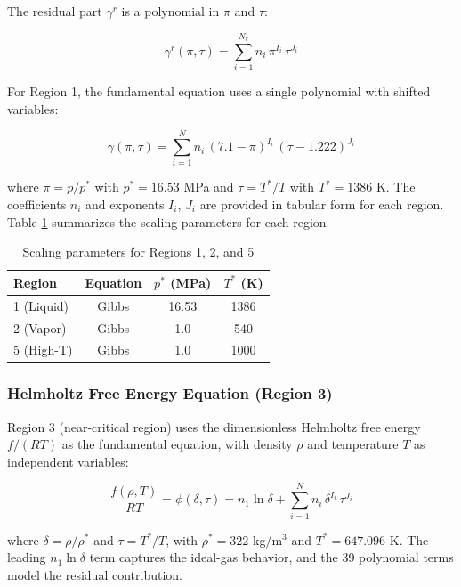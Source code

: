 \documentclass{article}
\begin{document}
The residual part $\gamma^r$ is a polynomial in $\pi$ and $\tau$:

\begin{equation}
\gamma^r(\pi,\tau) = \sum_{i=1}^{N_r} n_i \, \pi^{I_i} \, \tau^{J_i}
\label{eq:gibbs_residual}
\end{equation}

For Region 1, the fundamental equation uses a single polynomial with shifted variables:

\begin{equation}
\gamma(\pi,\tau) = \sum_{i=1}^{N} n_i \, (7.1 - \pi)^{I_i} \, (\tau - 1.222)^{J_i}
\label{eq:gibbs_r1}
\end{equation}

where $\pi = p/p^{*}$ with $p^{*} = 16.53$ MPa and $\tau = T^{*}/T$ with $T^{*} = 1386$ K. The coefficients $n_i$ and exponents $I_i$, $J_i$ are provided in tabular form for each region. Table \ref{tab:region_params} summarizes the scaling parameters for each region.

\begin{table}[H]
\centering
\caption{Scaling parameters for Regions 1, 2, and 5}
\label{tab:region_params}
\begin{tabular}{lccc}
\toprule
\textbf{Region} & \textbf{Equation} & \textbf{$p^{*}$ (MPa)} & \textbf{$T^{*}$ (K)} \\
\midrule
1 (Liquid) & Gibbs & 16.53 & 1386  \\
2 (Vapor) & Gibbs & 1.0 & 540  \\
5 (High-T) & Gibbs & 1.0 & 1000  \\
\bottomrule
\end{tabular}
\end{table}

\subsubsection{Helmholtz Free Energy Equation (Region 3)}

Region 3 (near-critical region) uses the dimensionless Helmholtz free energy $f/(RT)$ as the fundamental equation, with density $\rho$ and temperature $T$ as independent variables:

\begin{equation}
\frac{f(\rho,T)}{RT} = \phi(\delta,\tau) = n_1 \ln\delta + \sum_{i=1}^{N} n_i \, \delta^{I_i} \, \tau^{J_i}
\label{eq:helmholtz}
\end{equation}

where $\delta = \rho/\rho^{*}$ and $\tau = T^{*}/T$, with $\rho^{*} = 322$ kg/m$^3$ and $T^{*} = 647.096$ K. The leading $n_1 \ln\delta$ term captures the ideal-gas behavior, and the 39 polynomial terms model the residual contribution.
\end{document}
